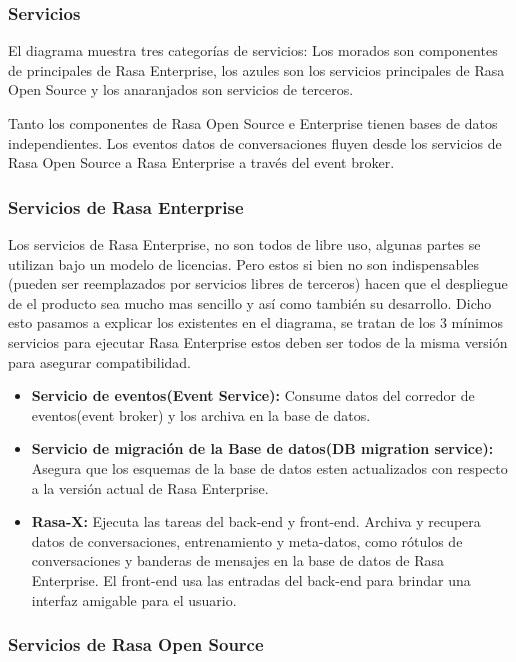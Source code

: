 \subsubsection{Servicios}
El diagrama muestra tres categorías de servicios: Los morados son componentes de principales de Rasa
Enterprise, los azules son los servicios principales de Rasa Open Source y los anaranjados son servicios 
de terceros.

Tanto los componentes de Rasa Open Source e Enterprise tienen bases de datos independientes. Los eventos
datos de conversaciones fluyen desde los servicios de Rasa Open Source a Rasa Enterprise a través del event broker.

\subsubsection{Servicios de Rasa Enterprise}

Los servicios de Rasa Enterprise, no son todos de libre uso, algunas partes se utilizan bajo un modelo de 
licencias. Pero estos si bien no son indispensables (pueden ser reemplazados por servicios libres de terceros) hacen que el despliegue de el producto sea mucho mas sencillo y así como también su desarrollo. Dicho esto pasamos a explicar los existentes en el diagrama, se tratan de los 3 mínimos servicios para 
ejecutar Rasa Enterprise estos deben ser todos de la misma versión para asegurar compatibilidad. 

\begin{itemize}
     \item \textbf{Servicio de eventos(Event Service):} Consume datos del corredor de eventos(event 
    broker) y los archiva en la base de datos.
     \item \textbf{Servicio de migración de la Base de datos(DB migration service):}  Asegura que los esquemas de la base de datos
     esten actualizados con respecto a la versión actual de Rasa Enterprise.
    \item \textbf{Rasa-X:} Ejecuta las tareas del back-end y front-end. Archiva y recupera datos de 
    conversaciones, entrenamiento y meta-datos, como rótulos de conversaciones y banderas de mensajes
    en la base de datos de Rasa Enterprise. El front-end usa las entradas del back-end para brindar una 
    interfaz amigable para el usuario.
\end{itemize}

\subsubsection{Servicios de Rasa Open Source}


